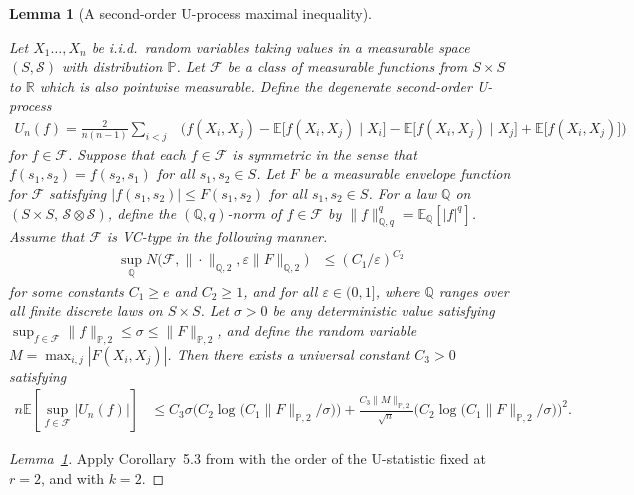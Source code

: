 \documentclass[11pt,lof]{puthesis}
\renewcommand{\P}{\ensuremath{\mathbb{P}}}
\newcommand{\R}{\ensuremath{\mathbb{R}}}
\newcommand{\E}{\ensuremath{\mathbb{E}}}
\newcommand{\Q}{\ensuremath{\mathbb{Q}}}
\newcommand{\cF}{\ensuremath{\mathcal{F}}}
\newcommand{\cS}{\ensuremath{\mathcal{S}}}
\theoremstyle{break}
\newtheorem{lemma}{Lemma}[section]
\theoremstyle{proof}
\newtheorem{proof}{Proof}
\begin{document}
\begin{lemma}[A second-order U-process maximal inequality]
  \label{lem:kernel_app_uprocess_maximal}

  Let $X_1 \ldots, X_n$
  be i.i.d.\ random variables taking values
  in a measurable space $(S, \cS)$
  with distribution $\P$.
  Let $\cF$ be a class of measurable functions from
  $S \times S$ to $\R$ which is also pointwise measurable.
  Define the degenerate second-order U-process
  \begin{align*}
    U_n(f)
    =
    \frac{2}{n(n-1)}
    \sum_{i<j}
    &\Big(
      f(X_i, X_j)
      - \E\big[f(X_i,X_j) \mid X_i\big]
      -
      \E\big[f(X_i,X_j) \mid X_j\big]
      + \E\big[f(X_i,X_j)\big]
    \Big)
  \end{align*}
  for $f \in \cF$.
  Suppose that each $f \in \cF$ is symmetric in the sense that
  $f(s_1,s_2) = f(s_2,s_1)$
  for all $s_1, s_2 \in S$.
  Let $F$ be a measurable envelope function for $\cF$
  satisfying $|f(s_1,s_2)| \leq F(s_1,s_2)$
  for all $s_1,s_2 \in S$.
  For a law $\Q$ on
  $(S \times S, \, \cS \otimes \cS)$,
  define the $(\Q,q)$-norm of $f \in \cF$ by
  $\|f\|_{\Q,q}^q = \E_\Q[|f|^q]$.
  Assume that $\cF$ is VC-type in the following manner.
  \begin{align*}
    \sup_\Q
    N\big(
      \cF, \|\cdot\|_{\Q,2}, \varepsilon \|F\|_{\Q,2}
    \big)
    &\leq
    (C_1/\varepsilon)^{C_2}
  \end{align*}
  for some constants
  $C_1 \geq e$
  and
  $C_2 \geq 1$,
  and for all $\varepsilon \in (0,1]$,
  where $\Q$ ranges over all finite discrete laws
  on
  $S \times S$.
  Let $\sigma > 0$ be any deterministic value satisfying
  $\sup_{f \in \cF} \|f\|_{\P,2} \leq \sigma \leq \|F\|_{\P,2}$,
  and define the random variable $M = \max_{i,j} |F(X_i, X_j)|$.
  Then there exists a universal constant $C_3 > 0$
  satisfying
  \begin{align*}
    n
    \E\left[
      \sup_{f \in \cF}
      \big| U_n(f) \big|
    \right]
    &\leq
    C_3 \sigma
    \Big(
      C_2 \log\big(C_1 \|F\|_{\P,2} / \sigma \big)
    \Big)
    + \frac{C_3 \|M\|_{\P,2}}{\sqrt{n}}
    \Big(
      C_2 \log\big(C_1 \|F\|_{\P,2} / \sigma \big)
    \Big)^2.
  \end{align*}

\end{lemma}

\begin{proof}[Lemma~\ref{lem:kernel_app_uprocess_maximal}]

  Apply Corollary~5.3
  from \citet{chen2020jackknife}
  with the order of the U-statistic fixed at
  $r=2$,
  and with $k=2$.
\end{proof}
\end{document}
